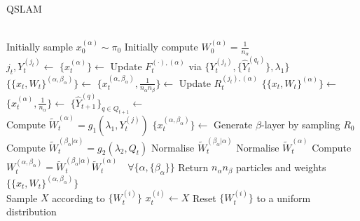 \documentclass[reprint,longbibliography]{revtex4-1} %
\begin{document}
\begin{algorithm}[H] %
	\caption{QSLAM}\label{algorithm:q-slam-pf}
	\begin{algorithmic}[0] 
		\\
		\State Initially sample $x_{0}^{(\alpha)} \sim \pi_0$ 
		\State Initially compute $W_0^{(\alpha)} = \frac{1}{n_\alpha}$
		\EndFor
		\EndProcedure 
		\EndIf
		\\
		\State $j_t, Y_t^{(j_t)} \gets$ 
		\EndIf
		\State $\{x_{t}^{(\alpha)}\} \gets $ 
		\State Update $F_t^{(\cdot), (\alpha)}$ via $ \{Y_t^{(j_t)},  \{\hat{Y}_t^{(q_t)}\}, \lambda_1\} $
		\State $\{\{x_t, W_t\}^{(\alpha, \beta_\alpha)}\} \gets $ 
		\State $\{x_t^{(\alpha, \beta_\alpha)}, \frac{1}{n_\alpha n_\beta}\} \gets $ 
		\State Update $R_t^{(j_t), (\alpha)}$
		\State $\{\{x_t, W_t\}^{(\alpha)}\} \gets$ 
		\State $\{x_t^{(\alpha)}, \frac{1}{n_\alpha}\} \gets $ 
		\EndFor
		\State $\{\hat{Y}_{t+1}^{(q)}\}_{q\in Q_{t+1}} \gets $ 
		\EndWhile \label{pseudoalgo:qslamr:endwhile2}			
		\EndProcedure
		\\ \dotfill
		\State Compute $\tilde{W}_t^{( \alpha )} = g_1(\lambda_1, Y_t^{(j)}) $ 
		\State $\{x_t^{(\alpha, \beta_\alpha)}\} \gets $  Generate $\beta$-layer by sampling $R_0$ 
		\State Compute $\tilde{W}_t^{( \beta_\alpha | \alpha)} = g_2(\lambda_2, Q_t) $
		\EndFor
		\State Normalise $\tilde{W}_t^{( \beta_\alpha | \alpha)}$
		\EndFor
		\State Normalise $\tilde{W}_t^{( \alpha)}$
		\State Compute $W_t^{(\alpha, \beta_\alpha)} =  \tilde{W}_t^{( \beta_\alpha | \alpha)} \tilde{W}_t^{( \alpha)} \quad \forall \{\alpha, \{\beta_\alpha\} \}$
		\State Return $ n_\alpha n_\beta $ particles and weights $\{\{x_t, W_t\}^{(\alpha, \beta_\alpha)}\}$		
		\EndFunction 
		\\ \dotfill
		\State Sample $X$  according to $\{W_t^{(i)}\}$
		\State $x_t^{(i)} \gets X$
		\EndFor
		\State Reset $\{W_t^{(i)}\}$ to a uniform distribution
		\EndFunction 
	\end{algorithmic}	
\end{algorithm}
\end{document}
